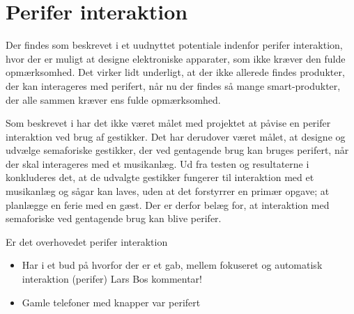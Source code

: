 \section{Perifer interaktion}
\label{DiskussionPeriferInteraktion}
%
Der findes som beskrevet i  et uudnyttet potentiale indenfor perifer interaktion, hvor der er muligt at designe elektroniske apparater, som ikke kræver den fulde opmærksomhed. Det virker lidt underligt, at der ikke allerede findes produkter, der kan interageres med perifert, når nu der findes så mange smart-produkter, der alle sammen kræver ens fulde opmærksomhed. 


Som beskrevet i  har det ikke været målet med projektet at påvise en perifer interaktion ved brug af gestikker. Det har derudover været målet, at designe og udvælge semaforiske gestikker, der ved gentagende brug kan bruges perifert, når der skal interageres med et musikanlæg. Ud fra testen og resultaterne i \fullref{\SocialAcceptpartname} konkluderes det, at de udvalgte gestikker fungerer til interaktion med et musikanlæg og sågar kan laves, uden at det forstyrrer en primær opgave; at planlægge en ferie med en gæst. Der er derfor belæg for, at interaktion med semaforiske ved gentagende brug kan blive perifer. 




Er det overhovedet perifer interaktion
%



\begin{itemize}
  \item Har i et bud på hvorfor der er et gab, mellem fokuseret og automatisk interaktion (perifer) Lars Bos kommentar!
  \item Gamle telefoner med knapper var perifert
\end{itemize}
%